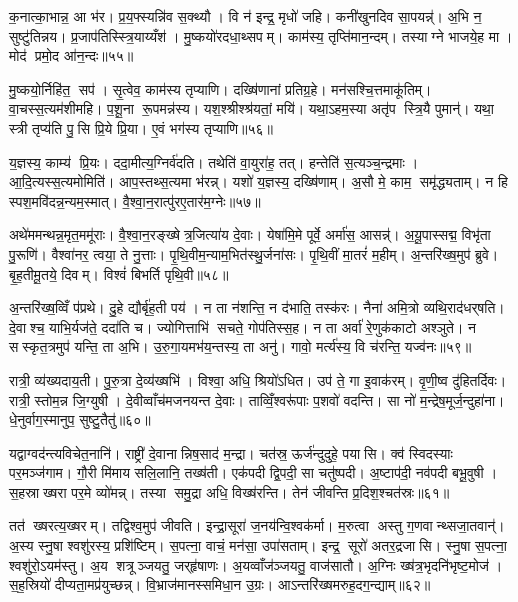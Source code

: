 क॒नात्का॒भान्न॒ आ भ॑र। प्र॒य॒फ्स्यन्नि॑व स॒क्थ्यौ। वि न॑ इन्द्र॒ मृधो॑ जहि। कनी॑खुनदिव सा॒पयन्न्॑। अ॒भि न॒ सुष्टु॑तिन्नय। प्र॒जाप॑तिस्स्त्रि॒याय्यँश॑। मु॒ष्कयो॑रदधा॒थ्सपम्। काम॑स्य॒ तृप्ति॑मान॒न्दम्। तस्याग्ने भाजये॒ह मा। मोद॑ प्रमो॒द आ॑न॒न्दः॥५५॥

मु॒ष्कयो॒र्निहि॑त॒ सप॑। सृ॒त्वेव॒ काम॑स्य तृप्याणि। दख्षि॑णानां प्रतिग्र॒हे। मन॑सश्चि॒त्तमाकू॑तिम्। वा॒चस्स॒त्यम॑शीमहि। प॒शू॒ना रू॒पमन्न॑स्य। यश॒श्श्रीश्श्र॑यतां॒ मयि॑। यथा॒ऽहम॒स्या अतृ॑प स्त्रि॒यै पुमान्॑। यथा॒ स्त्री तृप्य॑ति पु॒सि प्रि॒ये प्रि॒या। ए॒वं भग॑स्य तृप्याणि॥५६॥

य॒ज्ञस्य॒ काम्य॑ प्रि॒यः। ददा॒मीत्य॒ग्निर्व॑दति। तथेति॑ वा॒युरा॑ह॒ तत्। हन्तेति॑ स॒त्यञ्च॒न्द्रमाः। आ॒दि॒त्यस्स॒त्यमोमिति॑। आप॒स्तथ्स॒त्यमा भ॑रन्न्। यशो॑ य॒ज्ञस्य॒ दख्षि॑णाम्। अ॒सौ मे॒ काम॒ समृ॑द्ध्यताम्। न हि स्पश॒मवि॑दन्न॒न्यम॒स्मात्। वै॒श्वा॒न॒रात्पु॑रए॒तार॑म॒ग्नेः॥५७॥

अथे॑ममन्थन्न॒मृत॒ममू॑राः। वै॒श्वा॒न॒रङ्ख्षेत्र॒जित्या॑य दे॒वाः। येषा॑मि॒मे पूर्वे॒ अर्मा॑स॒ आसन्न्॑। अ॒यू॒पास्सद्म॒ विभृ॑ता पु॒रूणि॑। वैश्वा॑नर॒ त्वया॒ ते नु॒त्ताः। पृ॒थि॒वीम॒न्याम॒भित॑स्थु॒र्जना॑सः। पृ॒थि॒वीं मा॒तरं॑ म॒हीम्। अ॒न्तरि॑ख्ष॒मुप॑ ब्रुवे। बृ॒ह॒तीमू॒तये॒ दिवम्। विश्वं॑ बिभर्ति पृथि॒वी॥५८॥

अ॒न्तरि॑ख्ष॒व्विँ प॑प्रथे। दु॒हे द्यौर्बृ॑ह॒ती पय॑। न ता न॑शन्ति॒ न द॑भाति॒ तस्क॑रः। नैना॑ अमि॒त्रो व्यथि॒राद॑धर्‌षति। दे॒वाश्च॒ याभि॒र्यज॑ते॒ ददा॑ति च। ज्योगित्ताभि॑ सचते॒ गोप॑तिस्स॒ह। न ता अर्वा॑ रे॒णुक॑काटो अश्ञुते। न सस्कृत॒त्रमुप॑ यन्ति॒ ता अ॒भि। उ॒रु॒गा॒यमभ॑य॒न्तस्य॒ ता अनु॑। गावो॒ मर्त्य॑स्य॒ वि च॑रन्ति॒ यज्व॑नः॥५९॥

रात्री॒ व्य॑ख्यदाय॒ती। पु॒रु॒त्रा दे॒व्य॑ख्षभि॑। विश्वा॒ अधि॒ श्रियो॑ऽधित। उप॑ ते॒ गा इ॒वाक॑रम्। वृ॒णी॒ष्व दु॑हितर्दिवः। रात्री॒ स्तोम॒न्न जि॒ग्युषी। दे॒वीव्वाँच॑मजनयन्त दे॒वाः। ताव्विँ॒श्वरू॑पाः प॒शवो॑ वदन्ति। सा नो॑ म॒न्द्रेष॒मूर्ज॒न्दुहा॑ना। धे॒नुर्वाग॒स्मानुप॒ सुष्टु॒तैतु॑॥६०॥

यद्वाग्वद॑न्त्यविचेत॒नानि॑। राष्ट्री॑ दे॒वानान्निष॒साद॑ म॒न्द्रा। चत॑स्र॒ ऊर्ज॑न्दुदुहे॒ पयासि। क्व॑ स्विदस्याः पर॒मञ्ज॑गाम। गौ॒री मि॑माय सलि॒लानि॒ तख्ष॑ती। एक॑पदी द्वि॒पदी॒ सा चतु॑ष्पदी। अ॒ष्टाप॑दी॒ नव॑पदी बभू॒वुषी। स॒हस्राख्षरा पर॒मे व्यो॑मन्न्। तस्या समु॒द्रा अधि॒ विख्ष॑रन्ति। तेन॑ जीवन्ति प्र॒दिश॒श्चत॑स्रः॥६१॥

तत॑ ख्षरत्य॒ख्षरम्। तद्विश्व॒मुप॑ जीवति। इन्द्रा॒सूरा॑ ज॒नय॑न्वि॒श्वक॑र्मा। म॒रुत्वा अस्तु ग॒णवान्थ्सजा॒तवान्॑। अ॒स्य स्नु॒षा श्वशु॑रस्य॒ प्रशि॑ष्टिम्। स॒पत्ना॒ वाचं॒ मन॑सा॒ उपा॑सताम्। इन्द्र॒ सूरो॑ अतर॒द्रजासि। स्नु॒षा स॒पत्ना॒ श्वशु॑रो॒ऽयम॑स्तु। अ॒य शत्रूञ्जयतु॒ जर्‌हृ॑षाणः। अ॒यव्वाँज॑ञ्जयतु॒ वाज॑सातौ। अ॒ग्निः ख्ष॑त्र॒भृदनि॑भृष्ट॒मोज॑। स॒ह॒स्रियो॑ दीप्यता॒मप्र॑युच्छन्न्। वि॒भ्राज॑मानस्समिधा॒न उ॒ग्रः। आऽन्तरि॑ख्षमरुह॒दग॒न्द्याम्॥६२॥\anuvakamend[धा॒रय॑न्पुरो॒डाशं॒ बृह॒स्पति॑ञ्ज॒घन॑च्युतिमान॒न्दो भग॑स्य तृप्याण्य॒ग्नेः पृ॑थि॒वी यज्व॑न एतु प्र॒दिश॒श्चत॑स्रो॒ वाज॑सातौ च॒त्वारि॑ च]

